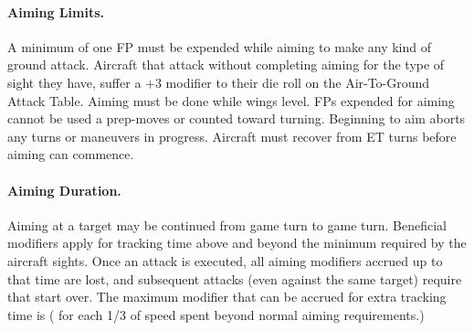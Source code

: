 
\paragraph{Aiming Limits.} A minimum of one FP must be expended while aiming to make any kind of ground attack. Aircraft that attack without completing aiming for the type of sight they have, suffer a +3 modifier to their die roll on the Air-To-Ground Attack Table. Aiming must be done while wings level. FPs expended for aiming cannot be used a prep-moves or counted toward turning. Beginning to aim aborts any turns or maneuvers in progress.  Aircraft must recover from ET turns before aiming can commence.

\paragraph{Aiming Duration.} Aiming at a target may be continued from game turn to game turn. Beneficial modifiers apply for tracking time above and beyond the minimum required by the aircraft sights. Once an attack is executed, all aiming modifiers accrued up to that time are lost, and subsequent attacks (even against the same target) require that start over. The maximum modifier that can be accrued for extra tracking time is  ( for each 1/3 of speed spent beyond normal aiming requirements.)

